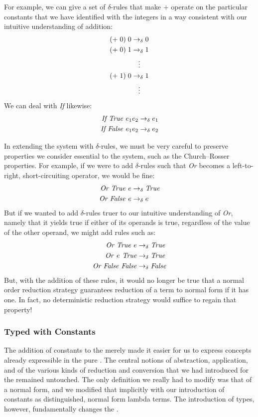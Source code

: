 For example, we can give a set of $\delta$-rules that make $+$ operate on the particular constants that we have identified with the integers in a way consistent with our intuitive understanding of addition:
\begin{align*}
(+\; 0)\; 0 &\dred 0\\
(+\; 0)\; 1 &\dred 1\\
&\hphantom{\rightarrow}\vdots\\
(+\; 1)\; 0 &\dred 1\\
&\hphantom{\rightarrow}\vdots
\end{align*}
We can deal with \textit{If} likewise:
\begin{align*}
\const{If True } e_{1} e_{2} &\dred e_{1}\\
\const{If False } e_{1} e_{2} &\dred e_{2}
\end{align*}

In extending the system with $\delta$-rules, we must be very careful to preserve properties we consider essential to the system, such as the Church--Rosser properties. For example, if we were to add $\delta$-rules such that \textit{Or} becomes a left-to-right, short-circuiting operator, we would be fine:
\begin{align*}
\const{Or True } e &\dred \const{True}\\
\const{Or False } e &\dred e
\end{align*}
But if we wanted to add $\delta$-rules truer to our intuitive understanding of \textit{Or}, namely that it yields true if either of its operands is true, regardless of the value of the other operand, we might add rules such as:
\begin{align*}
\const{Or True } e &\dred \const{True}\\
\const{Or } e \const{ True} &\dred \const{True}\\
\const{Or False False} &\dred \const{False}
\end{align*}
But, with the addition of these rules, it would no longer be true that a normal order reduction strategy guarantees reduction of a term to normal form if it has one. In fact, no deterministic reduction strategy would suffice to regain that property!

\subsubsection{Typed \LambdaCalc with Constants}
The addition of constants to the \lambdacalc merely made it easier for us to express concepts already expressible in the pure \lambdacalc{}. The central notions of abstraction, application, and of the various kinds of reduction and con\-ver\-sion that we had introduced for the \lambdacalc remained untouched. The only definition we really had to modify was that of a normal form, and we modified that implicitly with our introduction of constants as distinguished, normal form lambda terms. The introduction of types, however, fundamentally changes the \lambdacalc{}.

